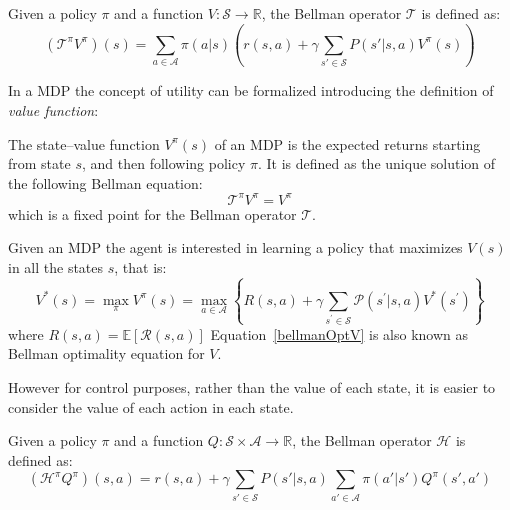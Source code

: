 	\begin{definition}
		Given a policy $\pi$ and a function $V: \mathcal{S} \rightarrow \mathbb{R}$, the Bellman operator $\mathcal{T}$ is defined as:
		\begin{equation}
			(\mathcal{T}^{\pi}V^{\pi})(s) = \sum_{a \in \mathcal{A}} \pi(a|s) \left ( r(s,a) + \gamma \sum_{s' \in \mathcal{S}} P(s'|s,a)V^{\pi}(s) \right )
		\end{equation}

	\end{definition}

	\noindent In a MDP the concept of utility can be formalized introducing the definition of \textit{value function}:
	\begin{definition}
		The state–value function $V^{\pi}(s)$ of an MDP is the expected returns starting from state $s$, and then following policy $\pi$. It
		is defined as the unique solution of the following Bellman equation:
		\begin{equation}
			\mathcal{T}^{\pi}V^{\pi} = V^{\pi}
		\end{equation}
		which is a fixed point for the Bellman operator $\mathcal{T}$.
	\end{definition}

	\noindent Given an MDP the agent is interested in learning a policy that maximizes $V(s)$ in all the states $s$, that is:
	\begin{equation}
		V^*(s) = \max_{\pi} V^{\pi}(s) = \max_{a \in \mathcal{A}} \left \{ R(s,a) + \gamma \sum_{s^{'} \in \mathcal{S}} \mathcal{P}(s^{'} | s,a) V^{*}(s^{'}) \right \}
		\label{bellmanOptV}
	\end{equation}
	where $R(s,a) = \mathbb{E}[\mathcal{R}(s,a)]$\newline
	Equation~\ref{bellmanOptV} is also known as Bellman optimality equation for $V$.\newline

	\noindent However for control purposes, rather than the value of each state, it is easier to consider the value of each action in each state.
	\begin{definition}
		Given a policy $\pi$ and a function $Q: \mathcal{S} \times \mathcal{A} \rightarrow \mathbb{R}$, the Bellman operator $\mathcal{H}$ is defined as:
		\begin{equation}
			(\mathcal{H}^{\pi}Q^{\pi})(s,a) = r(s,a) + \gamma \sum_{s' \in \mathcal{S}} P(s'|s,a) \sum_{a' \in \mathcal{A}} \pi(a'|s') Q^{\pi}(s',a')
			\label{bellqop}
		\end{equation}
	\end{definition}

